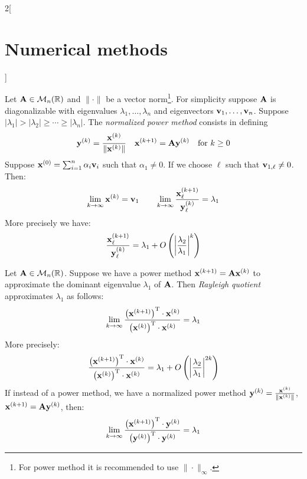 \documentclass[../../../main.tex]{subfiles}
\begin{document}
\begin{multicols}{2}[\section{Numerical methods}]
\begin{method}
  \end{method}
  \begin{method}
    Let $\boldsymbol{\mathrm{A}}\in\mathcal{M}_n(\mathbb{R})$ and $\|\cdot\|$ be a vector norm\footnote{For power method it is recommended to use $\|\cdot\|_\infty$.}. For simplicity suppose $\boldsymbol{\mathrm{A}}$ is diagonalizable with eigenvalues $\lambda_1,\ldots,\lambda_n$ and eigenvectors $\boldsymbol{\mathrm{v}}_1,\ldots,\boldsymbol{\mathrm{v}}_n$. Suppose $|\lambda_1|>|\lambda_2|\geq\cdots\geq|\lambda_n|$. The \textit{normalized power method} consists in defining $$\boldsymbol{\mathrm{y}}^{(k)}=\frac{\boldsymbol{\mathrm{x}}^{(k)}}{\|\boldsymbol{\mathrm{x}}^{(k)}\|}\quad\boldsymbol{\mathrm{x}}^{(k+1)}=\boldsymbol{\mathrm{A}}\boldsymbol{\mathrm{y}}^{(k)}\quad\text{for }k\geq 0$$ Suppose $\boldsymbol{\mathrm{x}}^{(0)}=\sum_{i=1}^n\alpha_i\boldsymbol{\mathrm{v}}_i$ such that $\alpha_1\ne0$. If we choose $\ell$ such that $\boldsymbol{\mathrm{v}}_{1,\ell}\ne0$. Then: $$\lim_{k\to\infty}\boldsymbol{\mathrm{x}}^{(k)}=\boldsymbol{\mathrm{v}}_1\qquad\lim_{k\to\infty}\frac{\boldsymbol{\mathrm{x}}_\ell^{(k+1)}}{\boldsymbol{\mathrm{y}}_\ell^{(k)}}=\lambda_1$$ More precisely we have: $$\frac{\boldsymbol{\mathrm{x}}_\ell^{(k+1)}}{\boldsymbol{\mathrm{y}}_\ell^{(k)}}=\lambda_1+O\left(\left|\frac{\lambda_2}{\lambda_1}\right|^k\right)$$
  \end{method}
  \begin{method}
    Let $\boldsymbol{\mathrm{A}}\in\mathcal{M}_n(\mathbb{R})$. Suppose we have a power method $\boldsymbol{\mathrm{x}}^{(k+1)}=\boldsymbol{\mathrm{A}}\boldsymbol{\mathrm{x}}^{(k)}$ to approximate the dominant eigenvalue $\lambda_1$ of $\boldsymbol{\mathrm{A}}$. Then \textit{Rayleigh quotient} approximates $\lambda_1$ as follows: $$\lim_{k\to\infty}\frac{\left(\boldsymbol{\mathrm{x}}^{(k+1)}\right)^\mathrm{T}\cdot \boldsymbol{\mathrm{x}}^{(k)}}{\left(\boldsymbol{\mathrm{x}}^{(k)}\right)^\mathrm{T}\cdot\boldsymbol{\mathrm{x}}^{(k)}}=\lambda_1$$
    More precisely: $$\frac{\left(\boldsymbol{\mathrm{x}}^{(k+1)}\right)^\mathrm{T}\cdot \boldsymbol{\mathrm{x}}^{(k)}}{\left(\boldsymbol{\mathrm{x}}^{(k)}\right)^\mathrm{T}\cdot\boldsymbol{\mathrm{x}}^{(k)}}=\lambda_1+O\left(\left|\frac{\lambda_2}{\lambda_1}\right|^{2k}\right)$$ If instead of a power method, we have a normalized power method $\boldsymbol{\mathrm{y}}^{(k)}=\frac{\boldsymbol{\mathrm{x}}^{(k)}}{\|\boldsymbol{\mathrm{x}}^{(k)}\|}$, $\boldsymbol{\mathrm{x}}^{(k+1)}=\boldsymbol{\mathrm{A}}\boldsymbol{\mathrm{y}}^{(k)}$, then: $$\lim_{k\to\infty}\frac{\left(\boldsymbol{\mathrm{x}}^{(k+1)}\right)^\mathrm{T}\cdot \boldsymbol{\mathrm{y}}^{(k)}}{\left(\boldsymbol{\mathrm{y}}^{(k)}\right)^\mathrm{T}\cdot\boldsymbol{\mathrm{y}}^{(k)}}=\lambda_1$$

\end{method}
\end{multicols}
\end{document}
